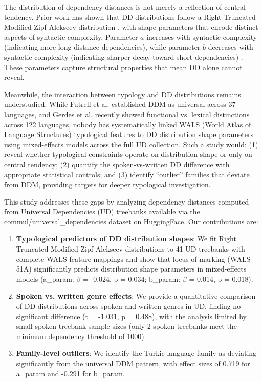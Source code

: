 \documentclass[11pt,letterpaper]{article}
\begin{document}
The distribution of dependency distances is not merely a reflection of central tendency. Prior work has shown that DD distributions follow a Right Truncated Modified Zipf-Alekseev distribution \cite{Popescu2014, Liu2017}, with shape parameters that encode distinct aspects of syntactic complexity. Parameter $a$ increases with syntactic complexity (indicating more long-distance dependencies), while parameter $b$ decreases with syntactic complexity (indicating sharper decay toward short dependencies) \cite{Liu2017}. These parameters capture structural properties that mean DD alone cannot reveal.

Meanwhile, the interaction between typology and DD distributions remains understudied. While Futrell et al. \cite{Futrell2015} established DDM as universal across 37 languages, and Gerdes et al. \cite{Gerdes2026} recently showed functional vs. lexical distinctions across 122 languages, nobody has systematically linked WALS (World Atlas of Language Structures) typological features \cite{Dryer2013} to DD distribution shape parameters using mixed-effects models across the full UD collection. Such a study would: (1) reveal whether typological constraints operate on distribution shape or only on central tendency; (2) quantify the spoken-vs-written DD difference with appropriate statistical controls; and (3) identify ``outlier'' families that deviate from DDM, providing targets for deeper typological investigation.

This study addresses these gaps by analyzing dependency distances computed from Universal Dependencies (UD) treebanks \cite{Nivre2020} available via the commul/universal\_dependencies dataset on HuggingFace. Our contributions are:

\begin{enumerate}
  \item \textbf{Typological predictors of DD distribution shapes}: We fit Right Truncated Modified Zipf-Alekseev distributions to 41 UD treebanks with complete WALS feature mappings and show that locus of marking (WALS 51A) significantly predicts distribution shape parameters in mixed-effects models (a\_param: $\beta$ = -0.024, p = 0.034; b\_param: $\beta$ = 0.014, p = 0.018).

  \item \textbf{Spoken vs. written genre effects}: We provide a quantitative comparison of DD distributions across spoken and written genres in UD, finding no significant difference (t = -1.031, p = 0.488), with the analysis limited by small spoken treebank sample sizes (only 2 spoken treebanks meet the minimum dependency threshold of 1000).

  \item \textbf{Family-level outliers}: We identify the Turkic language family as deviating significantly from the universal DDM pattern, with effect sizes of 0.719 for a\_param and -0.291 for b\_param.
\end{enumerate}
\end{document}
